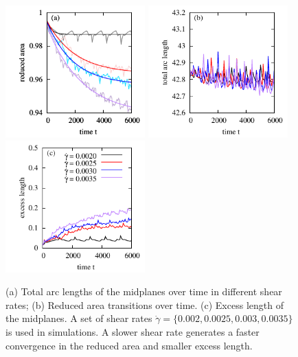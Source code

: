 \documentclass[lineno]{jfm}
\begin{document}
\begin{figure}
\begin{center}
\hspace{-1cm}
\includegraphics[height=2in]{ReducedArea.pdf}
\hspace{-1cm}
\includegraphics[height=2in]{ArcLength.pdf}
\hspace{-1cm}
\includegraphics[height=2in]{ExcLength.pdf}
\end{center} 
  \caption{(a) Total arc lengths of the midplanes over time in different shear rates; (b) Reduced area transitions over time. (c) Excess length of the midplanes.
A set of shear rates $\dot\gamma=\{0.002,0.0025,0.003,0.0035\}$ is used in simulations. 
A slower shear rate generates a faster convergence in the reduced area and smaller excess length. 
  }
    \label{figure4}
\end{figure}


\end{document}
